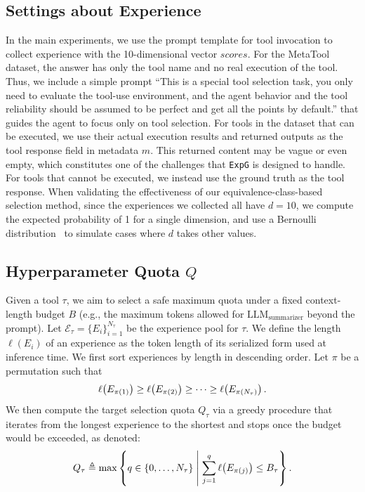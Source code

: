 \documentclass[11pt]{article}
\newcommand{\ours}{\texttt{ExpG}}
\begin{document}
\subsection{Settings about Experience}
In the main experiments, we use the prompt template for tool invocation to collect experience with the 10-dimensional vector $scores$. For the MetaTool dataset, the answer has only the tool name and no real execution of the tool. Thus, we include a simple prompt ``This is a special tool selection task, you only need to evaluate the tool-use environment, and the agent behavior and the tool reliability should be assumed to be perfect and get all the points by default.'' that guides the agent to focus only on tool selection. For tools in the dataset that can be executed, we use their actual execution results and returned outputs as the tool response field in metadata $m$. This returned content may be vague or even empty, which constitutes one of the challenges that {\ours} is designed to handle. For tools that cannot be executed, we instead use the ground truth as the tool response. When validating the effectiveness of our equivalence-class-based selection method, since the experiences we collected all have $d=10$, we compute the expected probability of 1 for a single dimension, and use a Bernoulli distribution~\cite{Bernoulli} to simulate cases where $d$ takes other values. 


\subsection{Hyperparameter Quota $Q$}
Given a tool $\tau$, we aim to select a safe maximum quota under a fixed context-length budget $B$ (e.g., the maximum tokens allowed for ${\text{LLM}}_{\text{summarizer}}$ beyond the prompt). Let $\mathcal{E}_\tau=\{E_i\}_{i=1}^{N_\tau}$ be the experience pool for $\tau$. We define the length $\ell(E_i)$ of an experience as the token length of its serialized form used at inference time.
We first sort experiences by length in descending order. Let $\pi$ be a permutation such that
\begin{equation}
\small
\label{eq:sort_desc}
\ell\!\left(E_{\pi(1)}\right)\ge \ell\!\left(E_{\pi(2)}\right)\ge \cdots \ge \ell\!\left(E_{\pi(N_\tau)}\right).
\end{equation}
We then compute the target selection quota $Q_\tau$ via a greedy procedure that iterates from the longest experience to the shortest and stops once the budget would be exceeded, as denoted:
\begin{equation}
\small
\label{eq:quota_greedy}
Q_\tau \triangleq \max\left\{q\in\{0,\ldots,N_\tau\} \;\middle|\; \sum_{j=1}^{q}\ell\!\left(E_{\pi(j)}\right)\le B_\tau \right\}.
\end{equation}
\end{document}
